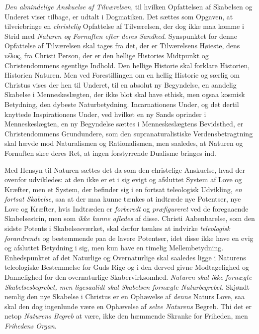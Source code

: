 \documentclass[12pt,a4paper]{book}
\newcommand{\opage}[1]{\marginnote{\footnotesize\textit{[#1]}}}
\begin{document}
\emph{Den almindelige Anskuelse af Tilværelsen}, til hvilken Opfattelsen af Skabelsen og
Underet viser tilbage, er \opage{89}udtalt i Dogmatiken. Det sættes som Opgaven, at tilveiebringe en \emph{christelig} Opfattelse af Tilværelsen, der dog ikke maa komme i Strid med \emph{Naturen og Fornuften efter deres Sandhed}. Synspunktet for denne Opfattelse af Tilværelsen skal
tages fra det, der er Tilværelsens Høieste, dens τέλος, fra Christi Person, der er den
hellige Histories Midtpunkt og Christendommens egentlige Indhold. Den hellige Historie
skal forklare Historien, Historien Naturen. Men ved Forestillingen om en hellig Historie
og særlig om Christus vises der hen til Underet, til en absolut ny Begyndelse, en aandelig
Skabelse i Menneskeslægten, der ikke blot skal have ethisk, men ogsaa kosmisk Betydning,
den dybeste Naturbetydning. Incarnationens Under, og det dertil knyttede Inspirationens
Under, ved hvilket en ny Sands oprinder i Menneskeslægten, en ny Begyndelse sættes i
Menneskeslægtens Bevidsthed, er Christendommens Grundundere, som den supranaturalistiske
Verdensbetragtning skal hævde mod Naturalismen og Rationalismen, men saaledes, at Naturen
og Fornuften skee deres Ret, at ingen forstyrrende Dualisme bringes ind.

Med Hensyn til Naturen sættes det da som den christelige Anskuelse, hvad der ovenfor
udvikledes: at den ikke er et i sig evigt og afsluttet System af Love og Kræfter, men et
System, der befinder sig i en fortsat teleologisk Udvikling, \emph{en fortsat Skabelse}, saa at
der maa kunne tænkes at indtræde nye Potentser, nye Love og Kræfter, hvis Indtræden er \emph{forberedt} og \emph{præfigureret} ved de foregaaende Skabelsestrin, men som \emph{ikke kunne afledes} af disse. Christi Aabenbarelse, som den sidste Potents i Skabelsesværket, skal derfor
tænkes at indvirke \emph{teleologisk forandrende} og bestemmende paa de lavere Potentser,
idet disse ikke have en evig og afsluttet Betydning i sig, men kun have en timelig
Mellembetydning. Enhedspunktet af det Naturlige og Overnaturlige skal saaledes ligge i
Naturens teleologiske Bestemmelse for Guds Rige og i den derved givne Modtagelighed og
Dannelighed for den overnaturlige Skabervirksomhed. \emph{Naturen skal ikke for\opage{90}nægte
Skabelsesbegrebet, men ligesaalidt skal Skabelsen fornægte Naturbegrebet}. Skjøndt nemlig
den nye Skabelse i Christus er en Ophævelse af \emph{denne} Naturs Love, saa skal den dog
ingenlunde være en Ophævelse af \emph{selve Naturens} Begreb. Thi det er netop \emph{Naturens Begreb} at
være, ikke den hæmmende Skranke for Friheden, men \emph{Frihedens Organ}.
\end{document}
